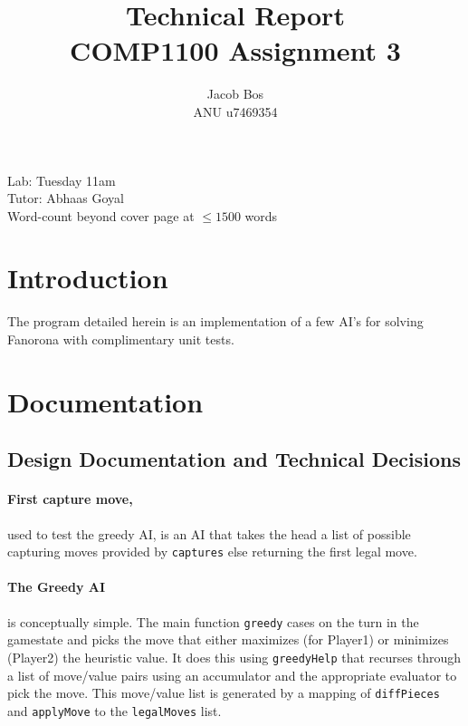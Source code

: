 \documentclass[11pt]{article}
\title{Technical Report\\ COMP1100 Assignment 3}
\author{Jacob Bos\\ ANU u7469354}
\begin{document}
\maketitle
{}
\begin{center}
  Lab: Tuesday 11am\\
  Tutor: Abhaas Goyal\\
  Word-count beyond cover page at $\leq 1500$ words
\end{center}
\tableofcontents
\newpage
{}
\section{Introduction} 
The program detailed herein is an implementation of a few AI's for solving Fanorona with complimentary unit tests.


\section{Documentation}%
\subsection*{Design Documentation and Technical Decisions}
\paragraph*{First capture move,} used to test the greedy AI, is an AI that takes the head a list of possible capturing moves provided by \verb|captures| else returning the first legal move.

\paragraph{The Greedy AI} is conceptually simple. The main function \verb|greedy| cases on the turn in the gamestate and picks the move that either maximizes (for Player1) or minimizes (Player2) the heuristic value. It does this using \verb|greedyHelp| that recurses through a list of move/value pairs using an accumulator and the appropriate evaluator to pick the move. This move/value list is generated by a mapping of \verb|diffPieces| and \verb|applyMove| to the \verb|legalMoves| list.
\end{document}
